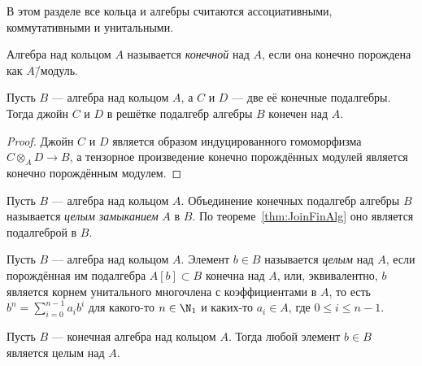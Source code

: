 \documentclass[
	extrafontsizes,
	11pt,
	hyphens,
]{memoir}
\begin{document}
\begin{convention}
В этом разделе все кольца и алгебры считаются ассоциативными, коммутативными и унитальными.
\end{convention}


\begin{definition}
Алгебра над кольцом \(A\) называется \emph{конечной} над \(A\), если она конечно порождена как \(A\)\=/модуль.
\end{definition}

\begin{theorem}
Пусть \(B\) --- алгебра над кольцом \(A\), а \(C\) и \(D\) --- две её конечные подалгебры.%
\label{thm:JoinFinAlg}
Тогда джойн \(C\) и \(D\) в решётке подалгебр алгебры \(B\) конечен над \(A\).
\end{theorem}

\begin{proof}
Джойн \(C\) и \(D\) является образом индуцированного гомоморфизма \(C \otimes_A D \to B\),
а тензорное произведение конечно порождённых модулей является конечно порождённым модулем. 
\end{proof}

\begin{definition}
Пусть \(B\) --- алгебра над кольцом \(A\).
Объединение конечных подалгебр алгебры \(B\) называется \emph{целым замыканием} \(A\) в \(B\). По теореме~\ref{thm:JoinFinAlg} оно является подалгеброй в \(B\).
\end{definition}

\begin{definition}
Пусть \(B\) --- алгебра над кольцом \(A\).
Элемент \(b \in B\) называется \emph{целым} над \(A\), если
порождённая им подалгебра \(A[b] \subset B\) конечна над \(A\),
или, эквивалентно,
\(b\) является корнем унитального многочлена с коэффициентами в \(A\), то есть
\(b^n = \sum_{i=0}^{n-1} a_i b^i\) для какого-то \(n \in \N_1\) и каких-то \(a_i \in A\), где \(0 \leq i \leq n-1\).
\end{definition}

\begin{theorem}
Пусть \(B\) --- конечная алгебра над кольцом \(A\).%
\label{thm:FinAlgIntegral}
Тогда любой элемент \(b \in B\) является целым над \(A\).
\end{theorem}
\end{document}
